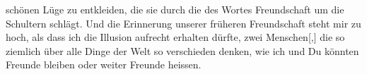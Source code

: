                schönen Lüge zu entkleiden, die sie durch die \label{T_L03520-6v}\label{T_L03520-6} des  Wortes Freundschaft um die Schultern schlägt. Und die Erinnerung
               unserer früheren Freundschaft steht mir zu hoch, als dass ich die Illusion aufrecht
               erhalten dürfte, zwei Menschen{[},{]} die so ziemlich über alle Dinge
               der Welt so verschieden denken, wie ich und Du könnten Freunde bleiben oder weiter
               Freunde heissen.\pend
           \endnumbering{}  \newcommand{\dateiname}{L03520}\newcommand{\titel}{Arthur Schnitzler an Paul Goldmann, nicht abgesandt, 28. 1. 1907}\newcommand{\editorInnen}{Martin Anton Müller und Laura Untner}
